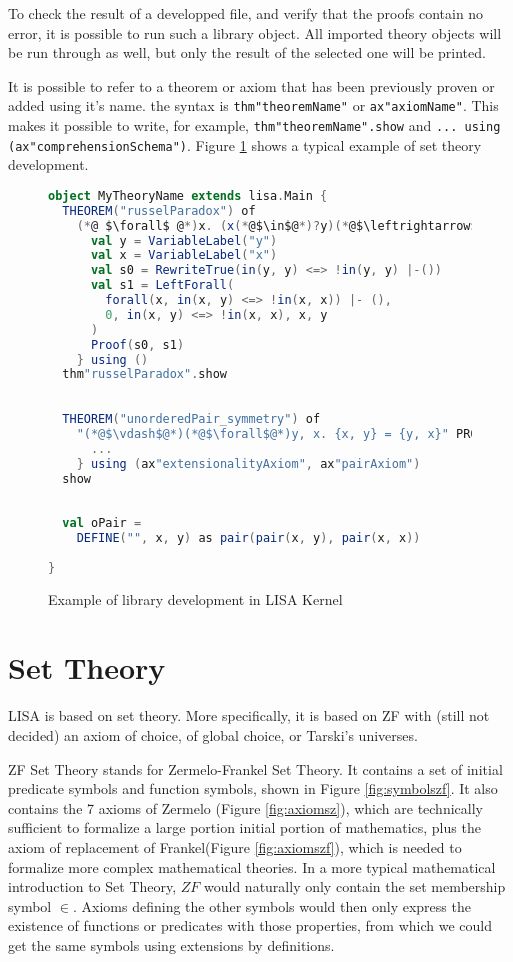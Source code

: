 To check the result of a developped file, and verify that the proofs contain no error, it is possible to run such a library object. All imported theory objects will be run through as well, but only the result of the selected one will be printed. 

It is possible to refer to a theorem or axiom that has been previously proven or added using it's name. the syntax is \lstinline{thm"theoremName"}{} or \lstinline{ax"axiomName"}{}. This makes it possible to write, for example, \lstinline{thm"theoremName".show}{} and \lstinline{... using (ax"comprehensionSchema")}{}. Figure \ref{fig:kernellibrary} shows a typical example of set theory development.


\begin{figure}
\begin{lstlisting}[language=Scala, frame=single]
object MyTheoryName extends lisa.Main {
  THEOREM("russelParadox") of 
    (*@ $\forall$ @*)x. (x(*@$\in$@*)?y)(*@$\leftrightarrow$@*) (*@$\neg$@*)(x(*@$\in$@*)x)(*@$\vdash$@*) PROOF {
      val y = VariableLabel("y")
      val x = VariableLabel("x")
      val s0 = RewriteTrue(in(y, y) <=> !in(y, y) |-())
      val s1 = LeftForall(
        forall(x, in(x, y) <=> !in(x, x)) |- (),
        0, in(x, y) <=> !in(x, x), x, y
      )
      Proof(s0, s1)
    } using ()
  thm"russelParadox".show
  
  
  THEOREM("unorderedPair_symmetry") of
    "(*@$\vdash$@*)(*@$\forall$@*)y, x. {x, y} = {y, x}" PROOF {
      ...
    } using (ax"extensionalityAxiom", ax"pairAxiom")
  show
  
  
  val oPair = 
    DEFINE("", x, y) as pair(pair(x, y), pair(x, x))
  
}
\end{lstlisting}
\caption{Example of library development in LISA Kernel}
\label{fig:kernellibrary}
\end{figure}





\chapter{Set Theory}
\label{chapt:settheory}
LISA is based on set theory. More specifically, it is based on ZF with (still not decided) an axiom of choice, of global choice, or Tarski's universes.

ZF Set Theory stands for Zermelo-Frankel Set Theory. It contains a set of initial predicate symbols and function symbols, shown in Figure \ref{fig:symbolszf}. It also contains the 7 axioms of Zermelo (Figure \ref{fig:axiomsz}), which are technically sufficient to formalize a large portion initial portion of mathematics, plus the axiom of replacement of Frankel(Figure \ref{fig:axiomszf}), which is needed to formalize more complex mathematical theories. 
In a more typical mathematical introduction to Set Theory, $ZF$ would naturally only contain the set membership symbol $\in$. Axioms defining the other symbols would then only express the existence of functions or predicates with those properties, from which we could get the same symbols using extensions by definitions.

